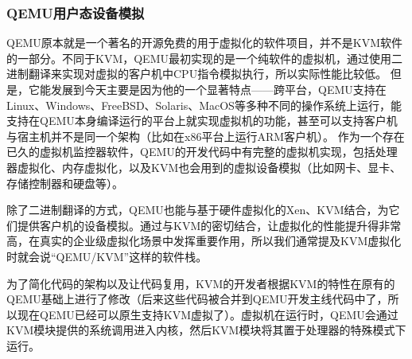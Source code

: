 \subsubsection{QEMU用户态设备模拟}

QEMU原本就是一个著名的开源免费的用于虚拟化的软件项目，并不是KVM软件的一部分。不同于KVM，QEMU最初实现的是一个纯软件的虚拟机，通过使用二进制翻译来实现对虚拟的客户机中CPU指令模拟执行，所以实际性能比较低。
但是，它能发展到今天主要是因为他的一个显著特点——跨平台，QEMU支持在Linux、Windows、FreeBSD、Solaris、MacOS等多种不同的操作系统上运行，能支持在QEMU本身编译运行的平台上就实现虚拟机的功能，甚至可以支持客户机与宿主机并不是同一个架构（比如在x86平台上运行ARM客户机）。
作为一个存在已久的虚拟机监控器软件，QEMU的开发代码中有完整的虚拟机实现，包括处理器虚拟化、内存虚拟化，以及KVM也会用到的虚拟设备模拟（比如网卡、显卡、存储控制器和硬盘等）。

除了二进制翻译的方式，QEMU也能与基于硬件虚拟化的Xen、KVM结合，为它们提供客户机的设备模拟。通过与KVM的密切结合，让虚拟化的性能提升得非常高，在真实的企业级虚拟化场景中发挥重要作用，所以我们通常提及KVM虚拟化时就会说“QEMU/KVM”这样的软件栈。


为了简化代码的架构以及让代码复用，KVM的开发者根据KVM的特性在原有的QEMU基础上进行了修改（后来这些代码被合并到QEMU开发主线代码中了，所以现在QEMU已经可以原生支持KVM虚拟了）。虚拟机在运行时，QEMU会通过KVM模块提供的系统调用进入内核，然后KVM模块将其置于处理器的特殊模式下运行。


